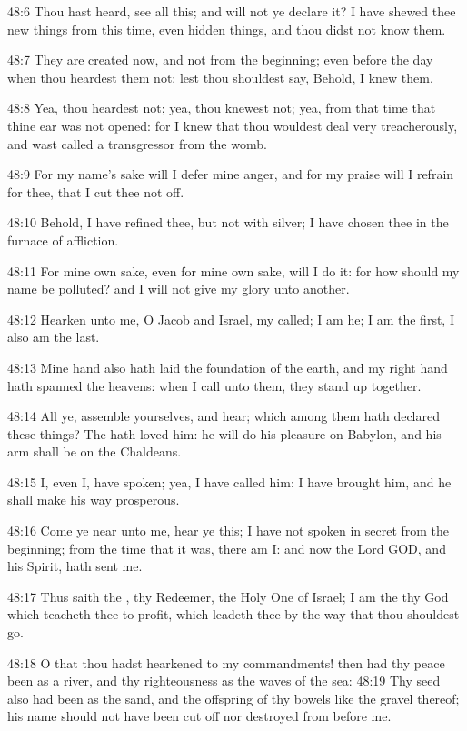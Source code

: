 48:6 Thou hast heard, see all this; and will not ye declare it? I have
shewed thee new things from this time, even hidden things, and thou
didst not know them.

48:7 They are created now, and not from the beginning; even before the
day when thou heardest them not; lest thou shouldest say, Behold, I
knew them.

48:8 Yea, thou heardest not; yea, thou knewest not; yea, from that
time that thine ear was not opened: for I knew that thou wouldest deal
very treacherously, and wast called a transgressor from the womb.

48:9 For my name's sake will I defer mine anger, and for my praise
will I refrain for thee, that I cut thee not off.

48:10 Behold, I have refined thee, but not with silver; I have chosen
thee in the furnace of affliction.

48:11 For mine own sake, even for mine own sake, will I do it: for how
should my name be polluted? and I will not give my glory unto another.

48:12 Hearken unto me, O Jacob and Israel, my called; I am he; I am
the first, I also am the last.

48:13 Mine hand also hath laid the foundation of the earth, and my
right hand hath spanned the heavens: when I call unto them, they stand
up together.

48:14 All ye, assemble yourselves, and hear; which among them hath
declared these things? The \LORD hath loved him: he will do his
pleasure on Babylon, and his arm shall be on the Chaldeans.

48:15 I, even I, have spoken; yea, I have called him: I have brought
him, and he shall make his way prosperous.

48:16 Come ye near unto me, hear ye this; I have not spoken in secret
from the beginning; from the time that it was, there am I: and now the
Lord GOD, and his Spirit, hath sent me.

48:17 Thus saith the \LORD, thy Redeemer, the Holy One of Israel; I am
the \LORD thy God which teacheth thee to profit, which leadeth thee by
the way that thou shouldest go.

48:18 O that thou hadst hearkened to my commandments! then had thy
peace been as a river, and thy righteousness as the waves of the sea:
48:19 Thy seed also had been as the sand, and the offspring of thy
bowels like the gravel thereof; his name should not have been cut off
nor destroyed from before me.


